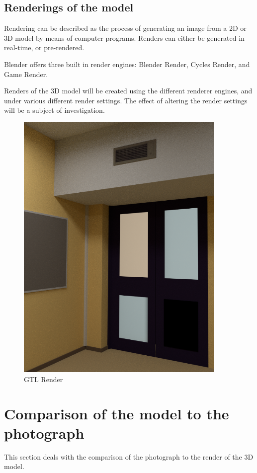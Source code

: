 \documentclass[11pt,a4paper]{report}
\begin{document}
		\subsection{Renderings of the model}
			Rendering can be described as the process of generating an image from a 2D or 3D model by means of computer programs. Renders can either be generated in real-time, or pre-rendered.
			
			Blender offers three built in render engines: Blender Render, Cycles Render, and Game Render.
			
			Renders of the 3D model will be created using the different renderer engines, and under various different render settings. The effect of altering the render settings will be a subject of investigation.
			
			\begin{figure}[H]
				\centering
				\includegraphics[width=0.9\textwidth]{gtl_render_1}
				\caption{GTL Render}
				\label{fig:gtl_render_1}
			\end{figure}
			
	\section{Comparison of the model to the photograph}
		This section deals with the comparison of the photograph to the render of the 3D model.
		
\end{document}
